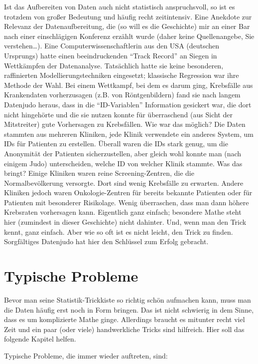\documentclass[12pt,ngerman,]{book}
\begin{document}
Ist das Aufbereiten von Daten auch nicht statistisch anspruchsvoll, so
ist es trotzdem von großer Bedeutung und häufig recht zeitintensiv. Eine
Anekdote zur Relevanz der Datenaufbereitung, die (so will es die
Geschichte) mir an einer Bar nach einer einschlägigen Konferenz erzählt
wurde (daher keine Quellenangebe, Sie verstehen\ldots{}). Eine
Computerwissenschaftlerin aus den USA (deutschen Ursprungs) hatte einen
beeindruckenden ``Track Record'' an Siegen in Wettkämpfen der
Datenanalyse. Tatsächlich hatte sie keine besonderen, raffinierten
Modellierungstechniken eingesetzt; klassische Regression war ihre
Methode der Wahl. Bei einem Wettkampf, bei dem es darum ging, Krebsfälle
aus Krankendaten vorherzusagen (z.B. von Röntgenbildern) fand sie nach
langem Datenjudo heraus, dass in die ``ID-Variablen'' Information
gesickert war, die dort nicht hingehörte und die sie nutzen konnte für
überraschend (aus Sicht der Mitstreiter) gute Vorhersagen zu
Krebsfällen. Wie war das möglich? Die Daten stammten aus mehreren
Kliniken, jede Klinik verwendete ein anderes System, um IDs für
Patienten zu erstellen. Überall waren die IDs stark genug, um die
Anonymität der Patienten sicherzustellen, aber gleich wohl konnte man
(nach einigem Judo) unterscheiden, welche ID von welcher Klinik stammte.
Was das bringt? Einige Kliniken waren reine Screening-Zentren, die die
Normalbevölkerung versorgte. Dort sind wenig Krebsfälle zu erwarten.
Andere Kliniken jedoch waren Onkologie-Zentren für bereits bekannte
Patienten oder für Patienten mit besonderer Risikolage. Wenig
überraschen, dass man dann höhere Krebsraten vorhersagen kann.
Eigentlich ganz einfach; besondere Mathe steht hier (zumindest in dieser
Geschichte) nicht dahinter. Und, wenn man den Trick kennt, ganz einfach.
Aber wie so oft ist es nicht leicht, den Trick zu finden. Sorgfältiges
Datenjudo hat hier den Schlüssel zum Erfolg gebracht.

\section{Typische Probleme}\label{typische-probleme}

Bevor man seine Statistik-Trickkiste so richtig schön aufmachen kann,
muss man die Daten häufig erst noch in Form bringen. Das ist nicht
schwierig in dem Sinne, dass es um komplizierte Mathe ginge. Allerdings
braucht es mitunter recht viel Zeit und ein paar (oder viele)
handwerkliche Tricks sind hilfreich. Hier soll das folgende Kapitel
helfen.

Typische Probleme, die immer wieder auftreten, sind:
\end{document}
